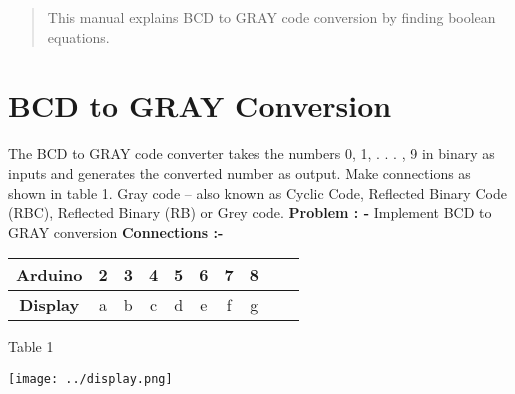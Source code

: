 \documentclass{article}
\begin{document}
\begin{multicols}{2}
\begin{center}
\author{Valmeekam Navya}
\begin{tableofcontents}
\begin{abstract}
    This manual explains BCD to GRAY code conversion by finding boolean equations.
\end{abstract}
\section{BCD to GRAY Conversion}
The BCD to GRAY code converter takes the numbers 0, 1, . . . , 9 in binary as inputs and generates the converted number as output. Make connections as shown in table 1.
Gray code – also known as Cyclic Code, Reflected Binary Code (RBC), Reflected Binary (RB) or Grey code.
\newline
\newline
\textbf{Problem : -}
Implement BCD to GRAY conversion 
\newline
\vspace{4cm}
\newline
\newline
\newline
\newline
\newline
\textbf{Connections :-}
\newline
\newline
\begin{tabular}{|c|c|c|c|c|c|c|c|c|c|}
\hline
\textbf{Arduino} & 2 & 3 & 4 & 5 & 6 & 7 & 8  \\
\hline
\textbf{Display} & {a} & {b} & {c} & {d} & {e} & {f} & {g} \\
\hline
\end{tabular}
\newline
Table 1

\texttt{[image: ../display.png]} 
\newpage

\end{tableofcontents}
\end{center}
\end{multicols}
\end{document}
